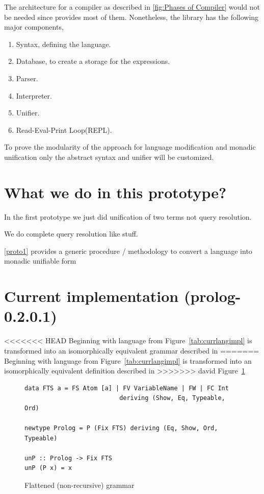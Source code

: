 \documentclass[thesis-solanki.tex]{subfiles}
\begin{document}
The architecture for a compiler as described in \ref{fig:Phases of Compiler} would not be needed since  provides most of
them. Nonetheless, the library has the following major components,

\begin{enumerate}
\item Syntax, defining the language.

\item Database, to create a storage for the expressions.

\item Parser.

\item Interpreter.

\item Unifier.

\item Read-Eval-Print Loop(REPL). 
\end{enumerate}

To prove the modularity of the approach for language modification and monadic unification only the abstract syntax and unifier will be
customized.


\clearpage
\section{What we do in this prototype?}
In the first prototype we just did unification of two terms not query resolution.

We do complete  query resolution like stuff.

\ref{proto1} provides a generic procedure / methodology to convert a language into monadic unifiable form

\clearpage
\section{Current implementation (prolog-0.2.0.1)}

<<<<<<< HEAD
Beginning with language from Figure~\ref{tab:currlangimpl} is transformed into an isomorphically equivalent grammar described in 
=======
Beginning with language from Figure~\ref{tab:currlangimpl} is transformed into an isomorphically equivalent definition described in
>>>>>>> david
Figure~\ref{tab:flatgrp0201}

\begin{figure}[h]
\begin{verbatim}
data FTS a = FS Atom [a] | FV VariableName | FW | FC Int
                          deriving (Show, Eq, Typeable, Ord)

newtype Prolog = P (Fix FTS) deriving (Eq, Show, Ord, Typeable)

unP :: Prolog -> Fix FTS
unP (P x) = x
\end{verbatim}
\caption{Flattened (non-recursive) grammar}
\label{tab:flatgrp0201}
\end{figure}
\end{document}
